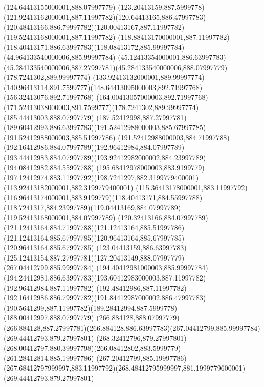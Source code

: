 {{	\closepath
	\moveto(124.64413155000001,888.07997779)
	\curveto(123.20413159,887.5999778)(121.92413162000001,887.11997782)(120.64413165,886.47997783)
	\curveto(120.48413166,886.79997782)(120.00413167,887.11997782)(119.52413168000001,887.11997782)
	\curveto(118.88413170000001,887.11997782)(118.40413171,886.63997783)(118.08413172,885.99997784)
	\lineto(44.964133540000006,885.99997784)
	\curveto(45.12413354000001,886.63997783)(45.284133540000006,887.27997781)(45.284133540000006,888.07997779)
	\closepath
	\moveto(178.7241302,889.99997774)
	\lineto(133.92413132000001,889.99997774)
	\curveto(140.96413114,891.7599777)(148.64413095000003,892.71997768)(156.32413076,892.71997768)
	\curveto(164.00413057000003,892.71997768)(171.52413038000003,891.7599777)(178.7241302,889.99997774)
	\closepath
	\moveto(185.44413003,888.07997779)
	\curveto(187.52412998,887.27997781)(189.60412993,886.63997783)(191.52412988000003,885.67997785)
	\lineto(191.52412988000003,885.51997786)
	\curveto(191.52412988000003,884.71997788)(192.16412986,884.07997789)(192.96412984,884.07997789)
	\curveto(193.44412983,884.07997789)(193.92412982000002,884.23997789)(194.08412982,884.55997788)
	\curveto(195.68412978000003,883.9199779)(197.12412974,883.11997792)(198.7241297,882.3199779400001)
	\lineto(113.92413182000001,882.3199779400001)
	\curveto(115.36413178000001,883.11997792)(116.96413174000001,883.9199779)(118.40413171,884.55997788)
	\curveto(118.7241317,884.23997789)(119.04413169,884.07997789)(119.52413168000001,884.07997789)
	\curveto(120.32413166,884.07997789)(121.12413164,884.71997788)(121.12413164,885.51997786)
	\curveto(121.12413164,885.67997785)(120.96413164,885.67997785)(120.96413164,885.67997785)
	\curveto(123.04413159,886.63997783)(125.12413154,887.27997781)(127.20413149,888.07997779)
	\closepath
	\moveto(267.04412799,885.99997784)
	\lineto(194.40412981000003,885.99997784)
	\curveto(194.24412981,886.63997783)(193.60412983000003,887.11997782)(192.96412984,887.11997782)
	\curveto(192.48412986,887.11997782)(192.16412986,886.79997782)(191.84412987000002,886.47997783)
	\curveto(190.5641299,887.11997782)(189.28412994,887.5999778)(188.00412997,888.07997779)
	\lineto(266.884128,888.07997779)
	\curveto(266.884128,887.27997781)(266.884128,886.63997783)(267.04412799,885.99997784)
	\closepath
	\moveto(269.44412793,879.27997801)
	\lineto(268.32412796,879.27997801)
	\curveto(268.00412797,880.39997798)(266.08412802,883.5999779)(261.28412814,885.19997786)
	\lineto(267.20412799,885.19997786)
	\curveto(267.68412797999997,883.11997792)(268.48412795999997,881.1999779600001)(269.44412793,879.27997801)
	\closepath
}}
